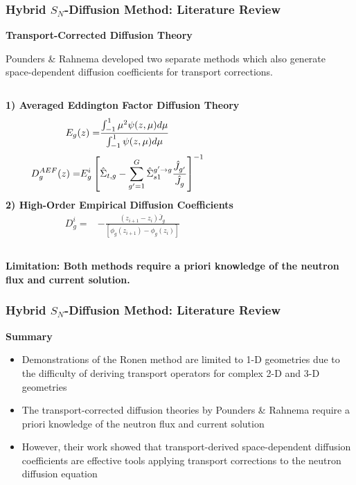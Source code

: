 \begin{frame}
  \frametitle{Hybrid $S_N$-Diffusion Method: Literature Review}
  \textbf{Transport-Corrected Diffusion Theory \cite{pounders_diffusion_2009}}
  \vspace{.2cm}
  
  Pounders \& Rahnema developed two separate methods which also
  generate space-dependent diffusion coefficients for transport corrections.
  \vspace{.1cm}
  \begin{columns}
    \textbf{1) Averaged Eddington Factor Diffusion Theory}
    \begin{align}
      \small
      E_g(z) =& \frac{\int^1_{-1} \mu^2\psi(z,\mu)d\mu}{\int^1_{-1} \psi(z,\mu)d\mu}
    \end{align}
    \begin{align}
      \small
      D^{AEF}_g(z) =& E^i_g\left[\hat{\Sigma}_{t,g}-\sum^G_{g'=1}\hat{\Sigma}^{g'\rightarrow g}_{s1}
      \frac{\hat{J}_{g'}}{\hat{J}_g}\right]^{-1}
    \end{align}
    \hfill
    \textbf{2) High-Order Empirical Diffusion Coefficients}
    \begin{align}
      D^i_g =& -\frac{\left(z_{i+1}-z_i\right) \bar{J}_g}{\left[\phi_g(z_{i+1})-\phi_g(z_i)\right]}
      \label{eq:emp}
    \end{align}
  \end{columns}
  \textbf{Limitation: Both methods require a priori knowledge of the neutron flux and current
  solution.}
\end{frame}

\begin{frame}
  \frametitle{Hybrid $S_N$-Diffusion Method: Literature Review}
  \begin{block}{\textbf{Summary}}
    \begin{itemize}
      \item Demonstrations of the Ronen method are limited to 1-D geometries due to the difficulty of
        deriving transport operators for complex 2-D and 3-D geometries
      \item The transport-corrected diffusion theories by Pounders \& Rahnema require a priori
        knowledge of the neutron flux and current solution
      \item However, their work showed that transport-derived space-dependent diffusion
        coefficients are effective tools applying transport corrections to the neutron diffusion
        equation
    \end{itemize}
  \end{block}
\end{frame}
